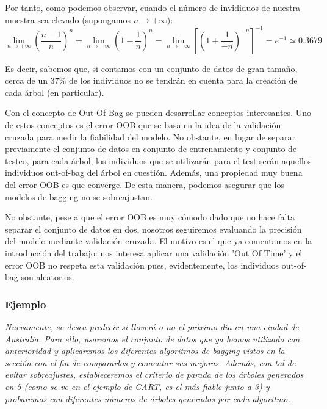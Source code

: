 \documentclass[12pt,twoside]{article}
\begin{document}
Por tanto, como podemos observar, cuando el número de invididuos de nuestra muestra sea elevado (supongamos $n \rightarrow +\infty$):
\begin{equation*}
\lim_{n \rightarrow + \infty} \left( \frac{n-1}{n} \right)^n = \lim_{n \rightarrow +\infty} \left( 1 - \frac{1}{n} \right)^n = \lim_{n \rightarrow +\infty} \left[ \left( 1 + \frac{1}{-n} \right)^{-n} \right] ^{-1} = e^{-1} \simeq 0.3679
\end{equation*}

Es decir, sabemos que, si contamos con un conjunto de datos de gran tamaño, cerca de un $37 \%$ de los individuos no se tendrán en cuenta para la creación de cada árbol (en particular).

Con el concepto de Out-Of-Bag se pueden desarrollar conceptos interesantes. Uno de estos conceptos es el error OOB que se basa en la idea de la validación cruzada para medir la fiabilidad del modelo. No obstante, en lugar de separar previamente el conjunto de datos en conjunto de entrenamiento y conjunto de testeo, para cada árbol, los individuos que se utilizarán para el test serán aquellos individuos out-of-bag del árbol en cuestión. Además, una propiedad muy buena del error OOB es que converge. De esta manera, podemos asegurar que los modelos de bagging no se sobreajustan.

No obstante, pese a que el error OOB es muy cómodo dado que no hace falta separar el conjunto de datos en dos, nosotros seguiremos evaluando la precisión del modelo mediante validación cruzada. El motivo es el que ya comentamos en la introducción del trabajo: nos interesa aplicar una validación 'Out Of Time' y el error OOB no respeta esta validación pues, evidentemente, los individuos out-of-bag son aleatorios.


\subsubsection{Ejemplo} \label{ex:Bag}
\textit{Nuevamente, se desea predecir si lloverá o no el próximo día en una ciudad de Australia. Para ello, usaremos el conjunto de datos que ya hemos utilizado con anterioridad y aplicaremos los diferentes algoritmos de bagging vistos en la sección con el fin de compararlos y comentar sus mejoras. Además, con tal de evitar sobreajustes, estableceremos el criterio de parada de los árboles generados en 5 (como se ve en el ejemplo de CART, es el más fiable junto a 3) y probaremos con diferentes números de árboles generados por cada algoritmo.}
\end{document}
